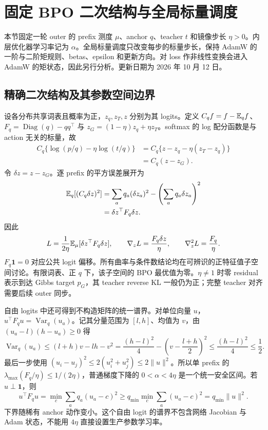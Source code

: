 \section{固定 BPO 二次结构与全局标量调度}
\label{dyn:scalar}

本节固定一轮 outer 的 prefix 测度 $\mu$、anchor $q$、teacher $t$ 和镜像步长 $\eta>0$。内层优化器学习率记为 $\alpha$。全局标量调度只改变每步的标量步长，保持 AdamW 的一阶与二阶矩规则、betas、epsilon 和更新方向。对 loss 作非线性变换会进入 AdamW 的矩状态，因此另行分析。更新日期为 2026 年 10 月 12 日。

\subsection{精确二次结构及其参数空间边界}

设各分布共享词表且概率为正，$z_q,z_T,z$ 分别为其 logits。定义 $C_q f=f-\mathbb E_q f$、$F_q=\operatorname{Diag}(q)-qq^\top$ 与 $z_G=(1-\eta)z_q+\eta z_T$。softmax 的 log 配分函数是与 action 无关的标量，故
\begin{align}
C_q\{\log(p/q)-\eta\log(t/q)\}
&=C_q\{z-z_q-\eta(z_T-z_q)\}\\
&=C_q(z-z_G).
\end{align}
令 $\delta z=z-z_G$。逐 prefix 的平方误差展开为
\begin{align}
\mathbb E_q[(C_q\delta z)^2]
&=\sum_a q_a(\delta z_a)^2-\left(\sum_a q_a\delta z_a\right)^2\\
&=\delta z^\top F_q\delta z.
\end{align}
因此
\begin{equation}
L=\frac{1}{2\eta}\mathbb E_\mu[\delta z^\top F_q\delta z],\qquad
\nabla_z L=\frac{F_q\delta z}{\eta},\qquad
\nabla_z^2L=\frac{F_q}{\eta}.
\end{equation}
$F_q\mathbf1=0$ 对应公共 logit 偏移。所有曲率与条件数结论均在可辨识的正特征值子空间讨论。有限词表、正 $q$ 下，该子空间的 BPO 最优值为零。$\eta\ne1$ 时零 residual 表示到达 Gibbs target $p_G$，其 teacher reverse KL 一般仍为正；完整 teacher 对齐需要后续 outer 同步。

自由 logits 中还可得到不构造矩阵的统一谱界。对单位向量 $u$，$u^\top F_qu=\operatorname{Var}_q(u_a)$。记其分量范围为 $[l,h]$、均值为 $v$，由 $(u_a-l)(h-u_a)\ge0$ 得
\begin{equation}
\operatorname{Var}_q(u_a)\le(l+h)v-lh-v^2
=\frac{(h-l)^2}{4}-\left(v-\frac{l+h}{2}\right)^2
\le\frac{(h-l)^2}{4}\le\frac12.
\end{equation}
最后一步使用 $(u_i-u_j)^2\le2(u_i^2+u_j^2)\le2\|u\|^2$。所以单 prefix 的 $\lambda_{\max}(F_q/\eta)\le1/(2\eta)$，普通梯度下降的 $0<\alpha<4\eta$ 是一个统一安全区间。若 $u\perp\mathbf1$，则
\begin{equation}
u^\top F_qu=\min_c\sum_aq_a(u_a-c)^2
\ge q_{\min}\min_c\sum_a(u_a-c)^2=q_{\min}\|u\|^2.
\end{equation}
下界随稀有 anchor 动作变小。这个自由 logit 的谱界不包含网络 Jacobian 与 Adam 状态，不能用 $4\eta$ 直接设置生产参数学习率。

